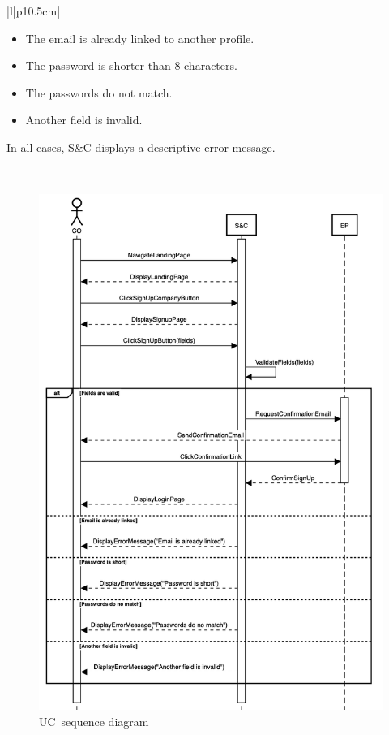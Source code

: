 \begin{longtable}{|l|p{10.5cm}|}
\begin{minipage}[t]{\linewidth}
\begin{itemize}[leftmargin=*, label=\tiny\textbullet]
                \item The email is already linked to another profile.
                \item The password is shorter than 8 characters.
                \item The passwords do not match.
                \item Another field is invalid.
            \end{itemize}
            In all cases, S\&C displays a descriptive error message.
            \vspace{10pt}
        \end{minipage} \\ \hline
\caption{Use case \theuc}
\end{longtable}

\begin{figure}
    \centering
    \includegraphics[width=13cm]{images/sequence-diagrams/company-signs-up.png}
    \caption{UC\theuc\ sequence diagram}
\end{figure}

